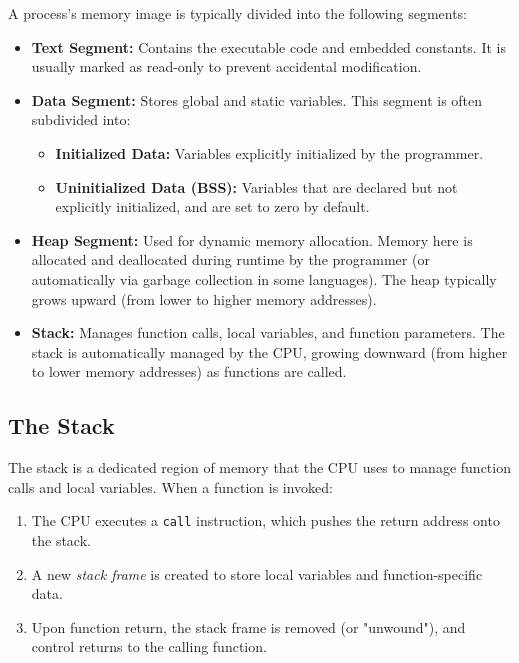 \documentclass[../../compsys.tex]{subfiles}
\begin{document}
\begin{definition}
A process's memory image is typically divided into the following segments:
\begin{itemize}
    \item \textbf{Text Segment:} Contains the executable code and embedded constants. It is usually marked as read-only to prevent accidental modification.
    \item \textbf{Data Segment:} Stores global and static variables. This segment is often subdivided into:
        \begin{itemize}
            \item \textbf{Initialized Data:} Variables explicitly initialized by the programmer.
            \item \textbf{Uninitialized Data (BSS):} Variables that are declared but not explicitly initialized, and are set to zero by default.
        \end{itemize}
    \item \textbf{Heap Segment:} Used for dynamic memory allocation. Memory here is allocated and deallocated during runtime by the programmer (or automatically via garbage collection in some languages). The heap typically grows upward (from lower to higher memory addresses).
    \item \textbf{Stack:} Manages function calls, local variables, and function parameters. The stack is automatically managed by the CPU, growing downward (from higher to lower memory addresses) as functions are called.
\end{itemize}
\end{definition}

\subsection{The Stack}

The stack is a dedicated region of memory that the CPU uses to manage function calls and local variables. When a function is invoked:
\begin{enumerate}
    \item The CPU executes a \texttt{call} instruction, which pushes the return address onto the stack.
    \item A new \emph{stack frame} is created to store local variables and function-specific data.
    \item Upon function return, the stack frame is removed (or "unwound"), and control returns to the calling function.
\end{enumerate}
\end{document}
